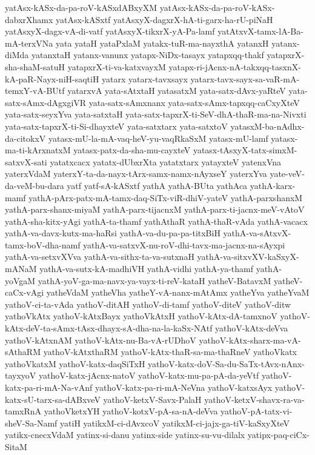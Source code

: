 {yatAsx-kASx-da-pa-roV-kASxdABxyXM
yatAsx-kASx-da-pa-roV-kASx-dabxrXhamx
yatAsx-kASxtf
yatAsxyX-dagxrX-hA-ti-garx-ha-rU-piNaH
yatAsxyX-dagx-vA-di-vatf
yatAsxyX-tikxrX-yA-Pa-lamf
yatAtxvX-tamx-lA-Ba-mA-terxVNa
yata
yataH
yataPxlaM
yatakx-tuR-ma-nayxthA
yatanxH
yatanx-diMda
yatanxtaH
yatanx-vanunx
yatapx-NiDx-tasayx
yatapxqq-thakf
yatapxrX-sha-shaM-satuH
yatapxrX-ti-va-katxvayxM
yatapx-ri-jAcnx-nA-takxqq-tasxnX-kA-paR-Nayx-niH-saqtiH
yatarx
yatarx-tavxsayx
yatarx-tavx-sayx-sa-vaR-mA-temxY-vA-BUtf
yatarxvA
yata-sAtxtaH
yatasatxM
yata-satx-dAvx-yaRteV
yata-satx-sAmx-dAgxgiVR
yata-satx-sAmxnanx
yata-satx-sAmx-tapxqq-caCxyXteV
yata-satx-seyxYva
yata-satxtaH
yata-satx-tapxrX-ti-SeV-dhA-thaR-ma-na-Nivxti
yata-satx-tapxrX-ti-Si-dhayxteV
yata-satxtarx
yata-satxtoV
yatasxM-ba-nAdhx-da-citokxV
yatasx-mU-la-mA-vaq-heV-yu-vaqRkaSxM
yatasx-mU-lamf
yatasx-ma-ti-kArxnatxM
yatasx-patx-da-sha-mu-cayxteV
yatasx-tAsxyX-tatx-simxM-satxvX-sati
yatatxcacx
yatatx-dUbxrXta
yatatxtarx
yatayxteV
yatenxVna
yaterxVdaM
yaterxY-ta-da-nayx-tArx-samx-namx-nAyxseY
yaterxYva
yate-veV-da-veM-bu-dara
yatf
yatf-sA-kASxtf
yathA
yathA-BUta
yathAca
yathA-karx-mamf
yathA-pArx-patx-mA-tamx-daq-SiTx-viR-dhiV-yateV
yathA-parxshanxM
yathA-parx-shanx-miyaM
yathA-parx-tijacnxM
yathA-parx-ti-jacnx-meV-vAtoV
yathA-sha-kitx-yAgi
yathA-ta-thamf
yathAthaR
yathA-thaR-vAda
yathA-vacacx
yathA-va-davx-kutx-ma-haRsi
yathA-va-du-pa-pa-titxBiH
yathA-va-sAtxvX-tamx-boV-dha-namf
yathA-va-satxvX-nu-roV-dhi-tavx-ma-jacnx-na-sAyxpi
yathA-va-setxvXVva
yathA-va-sithx-ta-va-sutxnaH
yathA-va-sitxvXV-kaSxyX-mANaM
yathA-va-sutx-kA-madhiVH
yathA-vidhi
yathA-ya-thamf
yathA-yoVgaM
yathA-yoV-ga-ma-navx-ya-vayx-ti-reV-kataH
yatheV-BatavxM
yatheV-caCx-vAgi
yatheVdaM
yatheVha
yatheY-vA-nanx-mAtAmx
yatheYva
yatheYvaM
yathoV-ci-ta-vAda
yathoV-ditAH
yathoV-di-tamf
yathoV-diteV
yathoV-ditw
yathoVkAtx
yathoV-kAtxBayx
yathoVkAtxH
yathoV-kAtx-dA-tamxnoV
yathoV-kAtx-deV-ta-sAmx-tAsx-dhayx-sA-dha-na-la-kaSx-NAtf
yathoV-kAtx-deVva
yathoV-kAtxnAM
yathoV-kAtx-nu-Ba-vA-rUDhoV
yathoV-kAtx-sharx-ma-vA-sAthaRM
yathoV-kAtxthaRM
yathoV-kAtx-thaR-sa-ma-thaRneV
yathoVkatx
yathoVkatxM
yathoV-katx-daqSiTxH
yathoV-katx-doV-Sa-du-SaTx-tAvx-nAnx-tayxyoV
yathoV-katx-jAcnx-natoV
yathoV-katx-mu-pa-pA-da-yeVtf
yathoV-katx-pa-ri-mA-Na-vAnf
yathoV-katx-pa-ri-mA-NeVna
yathoV-katxsAyx
yathoV-katx-sU-tarx-sa-dABxveV
yathoV-ketxV-Savx-PalaH
yathoV-ketxV-shavx-ra-va-tamxRnA
yathoVketxYH
yathoV-kotxV-pA-sa-nA-deVva
yathoV-pA-tatx-vi-sheV-Sa-Namf
yatiH
yatikxM-ci-dAvxcoV
yatikxM-ci-jajx-ga-tiV-kaSxyXteV
yatikx-cnecxVdaM
yatinx-si-danu
yatinx-side
yatinx-su-vu-dilalx
yatipx-paq-ciCx-SitaM
}
